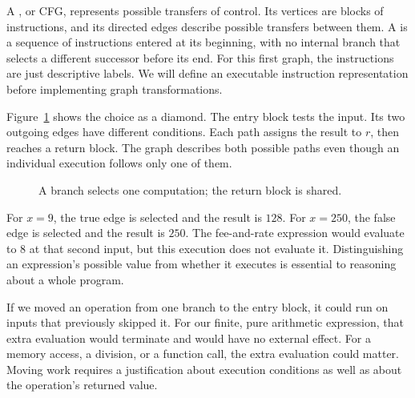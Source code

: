 A , or CFG, represents possible transfers of control.
Its vertices are blocks of instructions, and its directed edges describe possible transfers between them.
A  is a sequence of instructions entered at its beginning, with no internal branch that selects a different successor before its end.
For this first graph, the instructions are just descriptive labels.
We will define an executable instruction representation before implementing graph transformations.

Figure~\ref{fig:first-diamond} shows the choice as a diamond.
The entry block tests the input.
Its two outgoing edges have different conditions.
Each path assigns the result to $r$, then reaches a return block.
The graph describes both possible paths even though an individual execution follows only one of them.

\begin{figure}
  \centering
  \caption{A branch selects one computation; the return block is shared.}
  \label{fig:first-diamond}
\end{figure}

For $x=9$, the true edge is selected and the result is $128$.
For $x=250$, the false edge is selected and the result is $250$.
The fee-and-rate expression would evaluate to $8$ at that second input, but this execution does not evaluate it.
Distinguishing an expression's possible value from whether it executes is essential to reasoning about a whole program.

If we moved an operation from one branch to the entry block, it could run on inputs that previously skipped it.
For our finite, pure arithmetic expression, that extra evaluation would terminate and would have no external effect.
For a memory access, a division, or a function call, the extra evaluation could matter.
Moving work requires a justification about execution conditions as well as about the operation's returned value.

